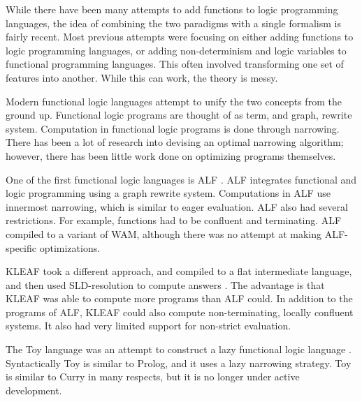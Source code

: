 
While there have been many attempts to add functions to logic programming languages,
the idea of combining the two paradigms with a single formalism is fairly recent.
Most previous attempts were focusing on either adding functions to logic programming languages,
or adding non-determinism and logic variables to functional programming languages.
This often involved transforming one set of features into another.
While this can work, the theory is messy.

Modern functional logic languages attempt to unify the two concepts from the ground up.
Functional logic programs are thought of as term, and graph, rewrite system.
Computation in functional logic programs is done through narrowing.
There has been a lot of research into devising an optimal narrowing algorithm;
however, there has been little work done on optimizing programs themselves.

One of the first functional logic languages is ALF \cite{alf}.
ALF integrates functional and logic programming using a graph rewrite system.
Computations in ALF use innermost narrowing, which is similar to eager evaluation.
ALF also had several restrictions. 
For example, functions had to be confluent and terminating.
ALF compiled to a variant of WAM, although there was no attempt at making ALF-specific optimizations.

KLEAF took a different approach, and compiled to a flat intermediate language, 
and then used SLD-resolution to compute answers \cite{kleaf}.
The advantage is that KLEAF was able to compute more programs than ALF could.
In addition to the programs of ALF, KLEAF could also compute non-terminating, locally confluent systems.
It also had very limited support for non-strict evaluation.

The Toy language was an attempt to construct a lazy functional logic language \cite{toy}.
Syntactically Toy is similar to Prolog, and it uses a lazy narrowing strategy.
Toy is similar to Curry in many respects, but it is no longer under active development.


